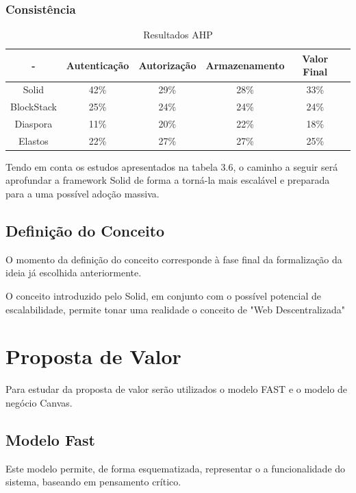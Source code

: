 \subsubsection{Consistência}

\begin{table}[h]
\centering
\caption{Resultados AHP}
\vspace{0.5cm}
\begin{tabular}{c|c|c|c|c|c} 
 - & Autenticação & Autorização & Armazenamento & Valor Final & \\
\hline                               
Solid & 42\% &	29\% & 28\%	& 33\% & \\
BlockStack &  25\% & 24\% & 24\% & 24\% & \\
Diaspora &  11\% &	20\% & 22\% & 18\% & \\
Elastos & 22\% & 27\% & 27\% & 25\% & \\
\end{tabular}
\end{table}


Tendo em conta os estudos apresentados na tabela 3.6, o caminho a seguir será aprofundar a framework Solid de forma a torná-la mais escalável e preparada para a uma possível adoção massiva.

\subsection{Definição do Conceito}
O momento da definição do conceito corresponde à fase final da formalização da ideia já escolhida anteriormente.

O conceito introduzido pelo Solid, em conjunto com o possível potencial de escalabilidade, permite tonar uma realidade o conceito de "Web Descentralizada"

\section{Proposta de Valor}
Para estudar da proposta de valor serão utilizados o modelo FAST e o modelo de negócio Canvas.

\subsection{Modelo Fast}
Este modelo permite, de forma esquematizada, representar o a funcionalidade do sistema, baseando em pensamento crítico.

